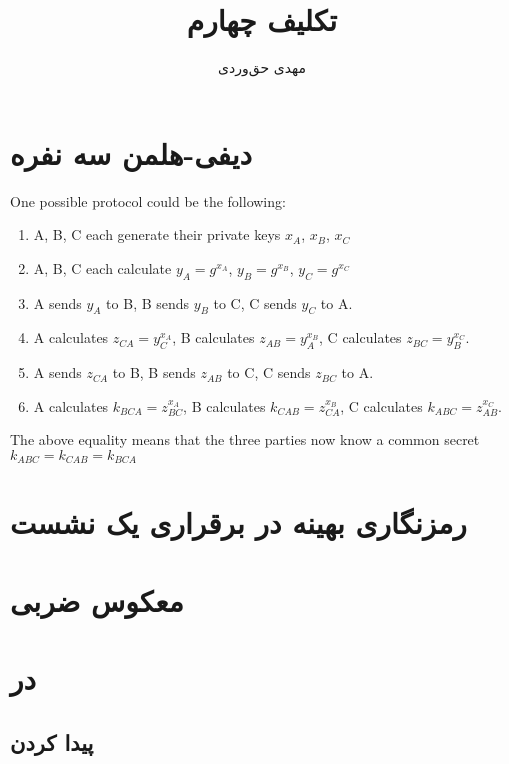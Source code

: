 \documentclass{article}
\title{تکلیف چهارم}
\author{مهدی حق‌وردی}
\begin{document}
\maketitle
\tableofcontents

\section{دیفی-هلمن سه نفره}
\begin{latin}
One possible protocol could be the following:

\begin{enumerate}
\item 
A, B, C each generate their private keys $x_A$, $x_B$, $x_C$

\item 
A, B, C each calculate $y_A = g^{x_A}$, $y_B = g^{x_B}$, $y_C = g^{x_C}$

\item 
A sends $y_A$ to B, B sends $y_B$ to C, C sends $y_C$ to A.

\item 
A calculates $z_{CA} = y^{x_A}_{C}$, B calculates $z_{AB} = y^{x_B}_{A}$, C calculates $z_{BC} = y^{x_C}_{B}$.

\item 
A sends $z_{CA}$ to B, B sends $z_{AB}$ to C, C sends $z_{BC}$ to A.

\item 
A calculates $k_{BCA} = z^{x_A}_{BC}$, 
B calculates $k_{CAB} = z^{x_B}_{CA}$,
C calculates $k_{ABC} = z^{x_C}_{AB}$.
\end{enumerate}

The above equality means that the three parties now know a common secret $k_{ABC} = k_{CAB} = k_{BCA}$

\end{latin}
\section{رمزنگاری بهینه در برقراری یک نشست }

\section{معکوس ضربی}

\section{در }
\subsection{پیدا کردن }
\end{document}
